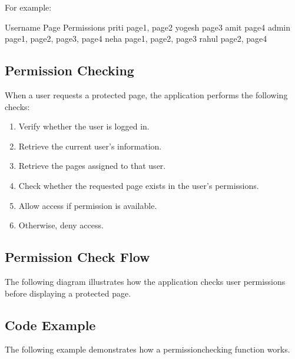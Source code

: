 \documentclass[letterpaper,10pt,english]{sphinxmanual}
\begin{document}
\sphinxAtStartPar
For example:

\begin{sphinxVerbatim}[commandchars=\\\{\}]
Username    Page Permissions
\PYGZhy{}\PYGZhy{}\PYGZhy{}\PYGZhy{}\PYGZhy{}\PYGZhy{}\PYGZhy{}\PYGZhy{}    \PYGZhy{}\PYGZhy{}\PYGZhy{}\PYGZhy{}\PYGZhy{}\PYGZhy{}\PYGZhy{}\PYGZhy{}\PYGZhy{}\PYGZhy{}\PYGZhy{}\PYGZhy{}\PYGZhy{}\PYGZhy{}\PYGZhy{}\PYGZhy{}
priti       page1, page2
yogesh      page3
amit        page4
admin       page1, page2, page3, page4
neha        page1, page2, page3
rahul       page2, page4
\end{sphinxVerbatim}


\subsection{Permission Checking}
\label{\detokenize{authorization:permission-checking}}
\sphinxAtStartPar
When a user requests a protected page, the application performs the following
checks:
\begin{enumerate}
%
\item {} 
\sphinxAtStartPar
Verify whether the user is logged in.

\item {} 
\sphinxAtStartPar
Retrieve the current user’s information.

\item {} 
\sphinxAtStartPar
Retrieve the pages assigned to that user.

\item {} 
\sphinxAtStartPar
Check whether the requested page exists in the user’s permissions.

\item {} 
\sphinxAtStartPar
Allow access if permission is available.

\item {} 
\sphinxAtStartPar
Otherwise, deny access.

\end{enumerate}


\subsection{Permission Check Flow}
\label{\detokenize{authorization:permission-check-flow}}
\sphinxAtStartPar
The following diagram illustrates how the application checks user permissions
before displaying a protected page.


\subsection{Code Example}
\label{\detokenize{authorization:code-example}}
\sphinxAtStartPar
The following example demonstrates how a permission\sphinxhyphen{}checking function works.
\end{document}
